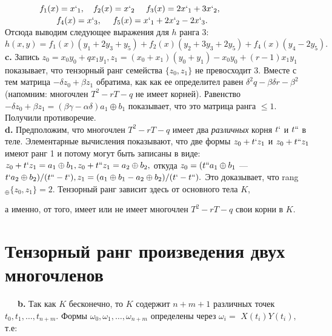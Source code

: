 \documentclass{mai_book}
\begin{document}
\indent~~~~~~~~$f_1(x)=x`_1,~~~f_2(x)=x`_2~~~~f_3(x)=2x`_1+3x`_2,$ \\
 \indent~~~~~~~~~~~~$f_4(x)=x`_3,~~~~f_5(x)=x`_1+2x`_2-2x`_3. $\\

\noindent Отсюда выводим следующее выражения для $h$ ранга 3: \\

$h(x,y)=f_1(x)(y_1+2y_3+y_5)+f_2(x)(y_2+3y_3+2y_5)+f_4(x)(y_4-2y_5).$ \\

\indent\textbf{c.} Запись $z_0=x_0y_0+qx_1y_1,z_1=(x_0+x_1)(y_0+y_1)-x_0y_0+(r-1)x_1y_1$\linebreak
показывает, что тензорный ранг семейства $\{z_0,z_1\}$ не превосходит 3.\linebreak
Вместе с тем матрица $-\delta z_0+\beta z_1$ обратима, как как ее определител\linebreak
равен $\delta^2q-\beta\delta r-\beta^2$ (напомним: многочлен $T^2-rT-q$ не имеет корней).\linebreak
Равенство $-\delta z_0+\beta z_1=(\beta\gamma-\alpha\delta)a_1\oplus b_1$ показывает, что это матрица\linebreak
ранга $\leq 1.$ Получили противоречие. \\

\indent\textbf{d.} Предположим, что многочлен $T^2-rT-q$ имеет два \textit{различных}\linebreak
корня $t`$ и $t``$ в теле. Элементарные вычисления показывают, что две\linebreak
формы $z_0+t`z_1$ и $z_0+t``z_1$ имеют ранг 1 и потому могут быть записаны\linebreak
в виде: $z_0+t`z_1=a_1\oplus b_1,z_0+t``z_1=a_2\oplus b_2,$ откуда $z_0=(t``a_1\oplus b_1$ ---\linebreak
$t`a_2\oplus b_2)/(t``-t`),z_1=(a_1\oplus b_1-a_2\oplus b_2)/(t`-t``).$ Это доказывает, что\linebreak
rang$_{\oplus}\{z_0,z_1\}=2.$ Тензорный ранг зависит здесь от основного тела $K$, \linebreak

\noindent а именно, от того, имеет или не имеет многочлен $T^2-rT-q$ свои корни\linebreak
в $K$.
\section{Тензорный ранг произведения двух многочленов} 
\indent~~~\textbf{b.} Так как $K$ бесконечно, то $K$ содержит $n+m+1$ различных\linebreak
точек $t_0,t_1,\ldots,t_{n+m}.$ Формы $\omega_0,\omega_1,\ldots,\omega_{n+m}$ определены через $\omega_i=$\linebreak
$X(t_i)Y(t_i),$ т.е: 
\end{document}
